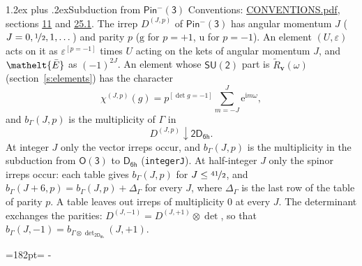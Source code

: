 \documentclass[10pt,a4paper]{article}
\makeatletter
\renewcommand\section{\@startsection{section}{1}{\z@}{-3ex plus -1ex minus -.2ex}%
  {1.2ex plus .2ex}{\normalfont\large\sffamily\bfseries\color{parttitle}}}
\newcommand{\needspace}[1]{\par\penalty-100\begingroup\dimen0=#1\relax\dimen2=\pagegoal
  \advance\dimen2-\pagetotal\ifdim\dimen0>\dimen2\relax\ifdim\dimen2>0pt\vfil\break\fi\fi
  \endgroup}
\numberwithin{equation}{section}
\newcommand{\eltfont}[1]{{\let\sigma\eltsigma\mathelt{#1}}}
\newcommand{\grp}[1]{\mathsf{#1}}
\newcommand{\elt}[1]{\eltfont{#1}}
\newcommand{\ptag}[1]{\mathrm{#1}}
\newcommand{\iverson}[1]{[#1]}
\newcommand{\restr}[2]{#1\!\downarrow#2}
\newcommand{\vv}{\mathbf{v}}
\newcommand{\iunit}{\mathrm{i}}
\newcommand{\expe}{\mathrm{e}}
\newcommand{\irrJp}[2]{D^{(#1,#2)}}
\newcommand{\irrprod}{\otimes}
\newcommand{\barred}[1]{\bar{#1}}
\newcommand{\lift}[1]{\tilde{#1}}
\makeatother
\begin{document}
\section{Subduction from \texorpdfstring{$\grp{Pin^{-}(3)}$}{Pin(3)}}\label{s:subduction_parent}
Conventions: \href{../../CONVENTIONS.pdf}{CONVENTIONS.pdf}, sections \href{../../../rotation/CONVENTIONS.pdf\#conv.11}{11} and \href{../../CONVENTIONS.pdf\#conv.25.1}{25.1}.
\leavevmode\label{n:index.J}\label{n:index.parity}\label{n:irrep.o3}The irrep $\irrJp{J}{p}$ of \href{Pinminus3.pdf}{$\grp{Pin^{-}(3)}$} has angular momentum $J$ ($J = 0, \nicefrac{1}{2}, 1, \dots$) and parity $p$ ($\ptag{g}$ for $p = +1$, $\ptag{u}$ for $p = -1$). An element $(U, \varepsilon)$ acts on it as $\varepsilon^{[p = -1]}$ times $U$ acting on the kets of angular momentum $J$, and $\elt{\barred{E}}$ as $(-1)^{2J}$. \label{n:function.character.parent}\label{n:function.multiplicity}An element whose $\grp{SU(2)}$ part is $\lift{R}_{\vv}(\omega)$ (section~\ref{s:elements}) has the character
\begin{equation}\label{e:chi}\chi^{(J,p)}(g) = p^{\iverson{\det g = -1}}\sum_{m=-J}^{J} \expe^{\iunit m\omega},\end{equation}
and $b_\Gamma(J, p)$ is the multiplicity of $\Gamma$ in
\begin{equation}\label{e:parent}\restr{\irrJp{J}{p}}{\grp{2D_{6h}}}.\end{equation}
At integer $J$ only the vector irreps occur, and $b_\Gamma(J, p)$ is the multiplicity in the subduction from $\grp{O(3)}$ to \href{../../../rotation/data/pdf/D6h.pdf}{$\grp{D_{6h}}$} (\texttt{integerJ}). \label{n:index.increment}At half-integer $J$ only the spinor irreps occur: each table gives $b_\Gamma(J, p)$ for $J \le \nicefrac{41}{2}$, and $b_\Gamma(J + 6, p) = b_\Gamma(J, p) + \Delta_\Gamma$ for every $J$, where $\Delta_\Gamma$ is the last row of the table of parity $p$. A table leaves out irreps of multiplicity 0 at every $J$.
\leavevmode\label{n:operator.determinant.character}The determinant exchanges the parities: $\irrJp{J}{-1} = \irrJp{J}{+1} \irrprod \det$, so that $b_\Gamma(J, -1) = b_{\Gamma \irrprod \det_{\grp{2D_{6h}}}}(J, +1)$.
\needspace{182pt}
\end{document}
